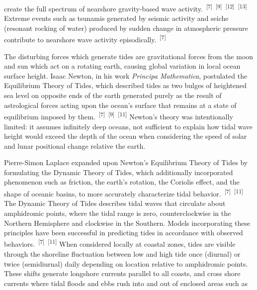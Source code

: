 \documentclass{article}
\begin{document}
\newpage
{}
\fancyfoot[C]{\thepage} 
\thispagestyle{fancy}

\par{\noindent create the full spectrum of nearshore gravity-based wave activity.~\textsuperscript{[7]}~\textsuperscript{[9]}~\textsuperscript{[12]}~\textsuperscript{[13]} Extreme events such as tsunamis generated by seismic activity and seiche (resonant rocking of water) produced by sudden change in atmospheric pressure contribute to nearshore wave activity episodically.~\textsuperscript{[7]}}

\par{The disturbing forces which generate tides are gravitational forces from the moon and sun which act on a rotating earth, causing global variation in local ocean surface height. Isaac Newton, in his work \textit{Principa Mathematica}, postulated the Equilibrium Theory of Tides, which described tides as two bulges of heightened sea level on opposite ends of the earth generated purely as the result of astrological forces acting upon the ocean's surface that remains at a state of equilibrium imposed by them.~\textsuperscript{[7]}~\textsuperscript{[9]}~\textsuperscript{[11]} Newton's theory was intentionally limited: it assumes infinitely deep oceans, not sufficient to explain how tidal wave height would exceed the depth of the ocean when considering the speed of solar and lunar positional change relative the earth.}

\par{Pierre-Simon Laplace expanded upon Newton's Equilibrium Theory of Tides by formulating the Dynamic Theory of Tides, which additionally incorporated phenomenon such as friction, the earth's rotation, the Coriolis effect, and the shape of oceanic basins, to more accurately characterize tidal behavior.~\textsuperscript{[7]}~\textsuperscript{[11]} The Dynamic Theory of Tides describes tidal waves that circulate about amphidromic points, where the tidal range is zero, counterclockwise in the Northern Hemisphere and clockwise in the Southern. Models incorporating these principles have been successful in predicting tides in accordance with observed behaviors.~\textsuperscript{[7]}~\textsuperscript{[11]}  When considered locally at coastal zones, tides are visible through the shoreline fluctuation between low and high tide once (diurnal) or twice (semidiurnal) daily depending on location relative to amphidromic points. These shifts generate longshore currents parallel to all coasts, and cross shore currents where tidal floods and ebbs rush into and out of enclosed areas such as}
\end{document}
